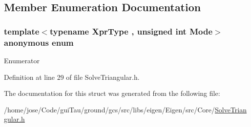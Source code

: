 \subsection{Member Enumeration Documentation}
\hypertarget{structei__is__part_3_01_part_3_01_xpr_type_00_01_mode_01_4_01_4_a2c2a395da5c28d3f2a3d4329b1806656}{\subsubsection[{anonymous enum}]{\setlength{\rightskip}{0pt plus 5cm}template$<$typename Xpr\-Type , unsigned int Mode$>$ anonymous enum}}\label{structei__is__part_3_01_part_3_01_xpr_type_00_01_mode_01_4_01_4_a2c2a395da5c28d3f2a3d4329b1806656}
\begin{Desc}
\item[Enumerator]\par
\begin{description}
\item[{\em 
\hypertarget{structei__is__part_3_01_part_3_01_xpr_type_00_01_mode_01_4_01_4_a2c2a395da5c28d3f2a3d4329b1806656acd6a41df757d9cd0f8a7e46264a86dc0}{value}\label{structei__is__part_3_01_part_3_01_xpr_type_00_01_mode_01_4_01_4_a2c2a395da5c28d3f2a3d4329b1806656acd6a41df757d9cd0f8a7e46264a86dc0}
}]\end{description}
\end{Desc}


Definition at line 29 of file Solve\-Triangular.\-h.



The documentation for this struct was generated from the following file\-:\begin{DoxyCompactItemize}
\item 
/home/jose/\-Code/gui\-Tau/ground/gcs/src/libs/eigen/\-Eigen/src/\-Core/\hyperlink{_solve_triangular_8h}{Solve\-Triangular.\-h}\end{DoxyCompactItemize}
